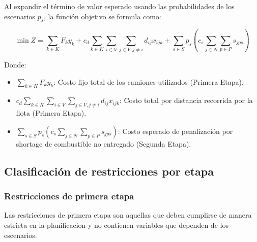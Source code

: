 Al expandir el término de valor esperado usando las probabilidades de los escenarios $p_s$, la función objetivo se formula como:

$$\min Z = \sum_{k \in K} F_k y_k + c_d \sum_{k \in K} \sum_{i \in V} \sum_{j \in V, j \neq i} d_{ij} x_{ijk} + \sum_{s \in S} p_s \left( c_s \sum_{j \in N} \sum_{p \in P} s_{jps} \right)$$

Donde:
\begin{itemize}
    \item $\sum_{k \in K} F_k y_k$: Costo fijo total de los camiones utilizados (Primera Etapa).
    
    \item $c_d \sum_{k \in K} \sum_{i \in V} \sum_{j \in V, j \neq i} d_{ij} x_{ijk}$: Costo total por distancia recorrida por la flota (Primera Etapa).
    
    \item $\sum_{s \in S} p_s \left( c_s \sum_{j \in N} \sum_{p \in P} s_{jps} \right)$: Costo esperado de penalización por shortage de combustible no entregado (Segunda Etapa).
\end{itemize}

\subsection{Clasificación de restricciones por etapa}

\subsubsection{Restricciones de primera etapa}
Las restricciones de primera etapa son aquellas que deben cumplirse de manera estricta en la planificacion y no contienen variables que dependen de los escenarios.

